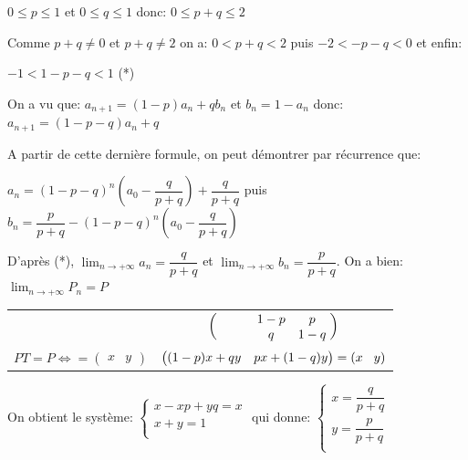 \documentclass[french]{book}
\begin{document}
\begin{demo}

   $0\leq p \leq 1$ et $0\leq q \leq 1$ donc: $0\leq p+q\leq 2$
   
   Comme $p+q\neq 0$ et $p+q\neq 2$ on a: $0 < p+q<  2$ puis $-2<-p-q<0$ et enfin:
   
   \begin{center}
   $\boxed{-1<1-p-q<1}$ (*)
   \end{center}
   
   On a vu que: $a_{n+1}=(1-p)a_{n}+qb_{n}$ et $b_{n}=1-a_{n}$ donc: $a_{n+1}=(1-p-q)a_{n}+q$
   
   A partir de cette dernière formule, on peut démontrer par récurrence que:
   
   \begin{center}
   $\boxed{a_{n}=(1-p-q)^{n}\left( a_{0}-\dfrac{q}{p+q}\right) +\dfrac{q}{p+q}}$ puis $\boxed{b_{n}=\dfrac{p}{p+q}-(1-p-q)^{n}\left( a_{0}-\dfrac{q}{p+q}\right) }$
   \end{center}
   
   D'après (*), $\lim_{n \to +\infty}\limits a_{n}=\dfrac{q}{p+q}$ et $\lim_{n \to +\infty}\limits b_{n}=\dfrac{p}{p+q}$. On a bien: $\lim_{n \to +\infty}\limits P_{n}=P$
   
   \begin{center}
    \begin{tabular}{cc}
    &$ \begin{pmatrix}
    \hspace{1.1cm}1-p & p \textcolor{white}{.} \\ 
  \hspace{1.1cm} q & 1-q \textcolor{white}{.} 
   \end{pmatrix} $ \\ 
 $PT=P\Leftrightarrow=\begin{pmatrix}
     x & y
   \end{pmatrix} $ & $\begin{pmatrix}
    (1-p)x+qy & px+(1-q)y  
   
   \end{pmatrix}= (x \hspace{0.3cm}y) $ \\
   
 \end{tabular} 
   \end{center}
     
   On obtient le système: $ \left\lbrace
\begin{array}{l}

 x-xp+yq = x\\[0.3cm]
 
  x+y = 1\\[0.3cm] 
\end{array}
\right.  $ qui donne: $ \left\lbrace
\begin{array}{l}

 x=\dfrac{q}{p+q}\\[0.3cm]
 
  y=\dfrac{p}{p+q}\\[0.3cm] 
\end{array}
\right.  $
   
      
   \end{demo}   
      
\end{document}
